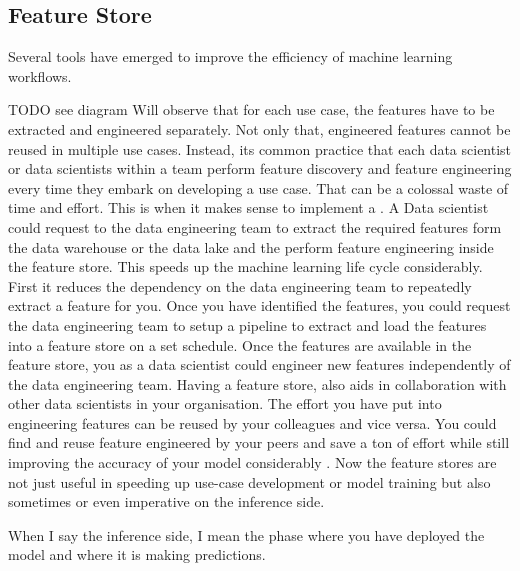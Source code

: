 \documentclass[a4paper, 11pt]{book}
\begin{document}
    \subsection{Feature Store}
    Several tools have emerged to improve the efficiency of machine learning workflows.

    TODO see diagram
    Will observe that for each use case, the features have to be extracted and engineered separately.
    Not only that, engineered features cannot be reused in multiple use cases.
    Instead, its common practice that each data scientist or data scientists within a team perform feature discovery and feature engineering every time they embark on developing a use case.
    That can be a colossal waste of time and effort.
    This is when it makes sense to implement a .
    A Data scientist could request to the data engineering team to extract the required features form the data warehouse or the data lake and the perform feature engineering inside the feature store.
    This speeds up the machine learning life cycle considerably.
    First it reduces the dependency on the data engineering team to repeatedly extract a feature for you.
    Once you have identified the features, you could request the data engineering team to setup a pipeline to extract and load the features into a feature store on a set schedule.
    Once the features are available in the feature store, you as a data scientist could engineer new features independently of the data engineering team.
    Having a feature store, also aids in collaboration with other data scientists in your organisation.
    The effort you have put into engineering features can be reused by your colleagues and vice versa.
    You could find and reuse feature engineered by your peers and save a ton of effort while still improving the accuracy of your model considerably .
    Now the feature stores are not just useful in speeding up use-case development or model training but also sometimes or even imperative on the inference side.

    When I say the inference side, I mean the phase where you have deployed the model and where it is making predictions.
\end{document}
